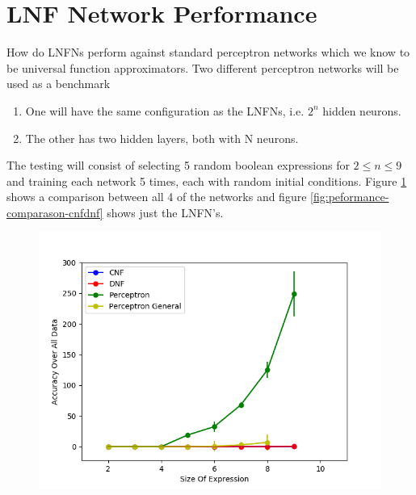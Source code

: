 \section{LNF Network Performance}
How do LNFNs perform against standard perceptron networks which we know to be universal function approximators. Two different perceptron networks will be used as a benchmark

\begin{enumerate}
	\item One will have the same configuration as the LNFNs, i.e. $2^n$ hidden neurons.
	\item The other has two hidden layers, both with N neurons.
\end{enumerate}

The testing will consist of selecting 5 random boolean expressions for $2 \leq n \leq 9$ and training each network 5 times, each with random initial conditions. Figure \ref{fig:peformance-comparason-all} shows a comparison between all 4 of the networks and figure \ref{fig:peformance-comparason-cnfdnf} shows just the LNFN's.


\begin{figure}[H]
  \centering
  \begin{minipage}[b]{0.8\textwidth}
    \includegraphics[width=\textwidth]{All-Peformance-Comparason.png}
    \caption{}
    \label{fig:peformance-comparason-all}
  \end{minipage}
  \hfill
\end{figure}

